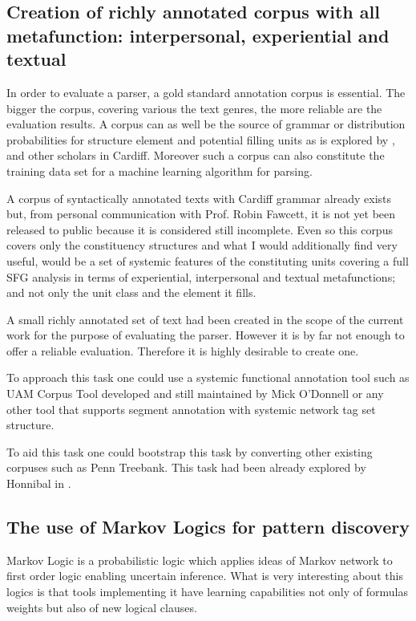 \subsection{Creation of richly annotated corpus with all metafunction: interpersonal, experiential and textual}
In order to evaluate a parser, a gold standard annotation corpus is essential.  The bigger the corpus, covering various the text genres, the more reliable are the evaluation results. A corpus can as well be the source of grammar or distribution probabilities for structure element and potential filling units as is explored by \citet{Day2007}, \citet{Souter1996} and other scholars in Cardiff. Moreover such a corpus can also constitute the training data set for a machine learning algorithm for parsing.

A corpus of syntactically annotated texts with Cardiff grammar already exists but, from personal communication with Prof. Robin Fawcett, it is not yet been released to public because it is considered still incomplete. Even so this corpus covers only the constituency structures and what I would additionally find very useful, would be a set of systemic features of the constituting units covering a full SFG analysis in terms of experiential, interpersonal and textual metafunctions; and not only the unit class and the element it fills.

A small richly annotated set of text had been created in the scope of the current work for the purpose of evaluating the parser. However it is by far not enough to offer a reliable evaluation. Therefore it is highly desirable to create one. 

To approach this task one could use a systemic functional annotation tool such as UAM Corpus Tool \citep{ODonnell2008,ODonnell2008a} developed and still maintained by Mick O'Donnell or any other tool that supports segment annotation with systemic network tag set structure.

To aid this task one could bootstrap this task by converting other existing corpuses such as Penn Treebank. This task had been already explored by Honnibal in \citeyear{Honnibal2004a,Honnibal2007}.

\subsection{The use of Markov Logics for pattern discovery}
Markov Logic \citep{Richardson2006,Domingos2010} is a probabilistic logic which applies ideas of Markov network to first order logic enabling uncertain inference. What is very interesting about this logics is that tools implementing it have learning capabilities not only of formulas weights but also of new logical clauses. 

